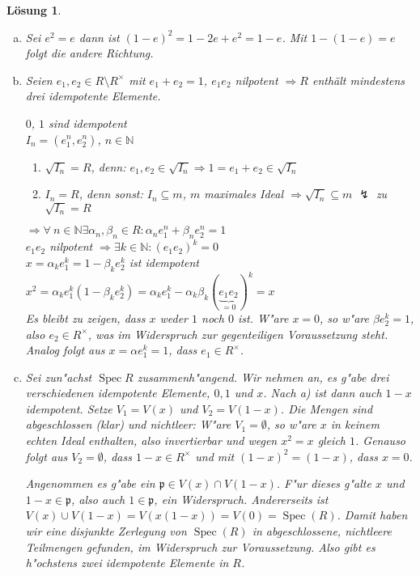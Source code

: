 \documentclass[paper = A4, fontsize=12pt, numbers=noendperiod, chapterprefix=true]{scrbook}
\theoremstyle{break}
\newtheorem{Loes}{L\"osung}
\theoremstyle{nonumberbreak}
\theoremstyle{nonumberplain}
\DeclareMathOperator{\Spec}{Spec}
\newcommand{\N}{\mathbb{N}}
\newcommand{\p}{\mathfrak{p}} %
\begin{document}
\begin{Loes}\begin{enumerate}[a)]
\item
	Sei $e^2 = e$ dann ist $(1-e)^2 = 1 -2e + e^2 = 1-e$. Mit $1-(1-e) = e$ folgt die andere Richtung.
\item
	Seien $e_1,e_2 \in R\setminus R^{\times}$ mit $e_1 + e_2 =1$, $e_1e_2$ nilpotent $\Rightarrow R$ enth\"alt mindestens drei idempotente Elemente.
	
	$0$, $1$ sind idempotent\\
	$I_n = (e_1^n, e_2^n)$, $n\in \N$\begin{enumerate}[\textbullet]
	\item
		$\sqrt{I_n} = R$, denn: $e_1, e_2 \in \sqrt{I_n} \Rightarrow 1= e_1 + e_2 \in \sqrt{I_n}$
	\item
		$I_n = R$, denn sonst: $I_n \subseteq m$, $m$ maximales Ideal $\Rightarrow \sqrt{I_n} \subseteq m$ $\lightning$ zu $\sqrt{I_n} = R$
	\end{enumerate}
	$\Rightarrow \forall\  n \in \N \exists  \alpha_n, \beta_n \in R: \alpha_n e_1^n + \beta_n e_2^n = 1$\\
	$e_1e_2$ nilpotent $\Rightarrow \exists k \in \N: (e_1e_2)^k = 0$\\
	$x = \alpha_ke_1^k = 1 - \beta_ke_2^k$ ist idempotent\\
	$x^2 = \alpha_ke_1^k (1- \beta_ke_2^k) = \alpha_k e_1^k - \alpha_k \beta_k (\underbrace{e_1e_2}_{=0})^k = x$\\
	Es bleibt zu zeigen, dass $x$ weder $1$ noch $0$ ist. W"are $x=0$, so w"are $\beta e_2^k = 1$, also $e_2 \in R^\times$, was im Widerspruch zur gegenteiligen Voraussetzung steht. Analog folgt aus $x = \alpha e_1^k = 1$, dass $e_1 \in R^\times$.
  
  \item Sei zun"achst $\Spec R$ zusammenh"angend. Wir nehmen an, es g"abe drei verschiedenen idempotente Elemente, $0,1$ und $x$. Nach a) ist dann auch $1-x$ idempotent. Setze $V_1 = V(x)$ und $V_2 = V(1-x)$. Die Mengen sind abgeschlossen (klar) und nichtleer: 
  W"are $V_1 = \emptyset$, so w"are $x$ in keinem echten Ideal enthalten, also invertierbar und wegen $x^2 = x$ gleich $1$. Genauso folgt aus $V_2 = \emptyset$, dass $1-x\in R^{\times}$ und mit $(1-x)^2 = (1-x)$, dass $x = 0$.

  Angenommen es g"abe ein $\p \in V(x)\cap V(1-x)$. F"ur dieses g"alte $x$ und $1-x \in \p$, also auch $1\in \p$, ein Widerspruch. Andererseits ist $V(x)\cup V(1-x) = V(x(1-x))= V(0) = \Spec(R)$. Damit haben wir eine disjunkte Zerlegung von $\Spec(R)$ in abgeschlossene, nichtleere Teilmengen gefunden, im Widerspruch zur Voraussetzung. Also gibt es h"ochstens zwei idempotente Elemente in $R$.


\end{enumerate}
\end{Loes}
\end{document}
